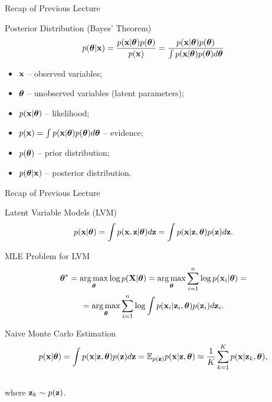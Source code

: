 \documentclass{beamer}
\begin{document}
\begin{frame}
	\titlepage
	\resetonslide
\end{frame}
\begin{frame}{Recap of Previous Lecture}
	\begin{block}{Posterior Distribution (Bayes' Theorem)}
		\[
			p(\boldsymbol{\theta} | \mathbf{x}) = \frac{p(\mathbf{x} | \boldsymbol{\theta}) p(\boldsymbol{\theta})}{p(\mathbf{x})} = \frac{p(\mathbf{x} | \boldsymbol{\theta}) p(\boldsymbol{\theta})}{\int p(\mathbf{x} | \boldsymbol{\theta}) p(\boldsymbol{\theta}) d \boldsymbol{\theta}} 
		\]
		\begin{itemize}
			\item $\mathbf{x}$ -- observed variables;
			\item $\boldsymbol{\theta}$ -- unobserved variables (latent parameters);
			\item $p(\mathbf{x} | \boldsymbol{\theta})$ -- likelihood;
			\item $p(\mathbf{x}) = \int p(\mathbf{x} | \boldsymbol{\theta}) p(\boldsymbol{\theta}) d \boldsymbol{\theta}$ -- evidence;
			\item $p(\boldsymbol{\theta})$ -- prior distribution;
			\item $p(\boldsymbol{\theta} | \mathbf{x})$ -- posterior distribution.
		\end{itemize}
	\end{block}
\end{frame}
\begin{frame}{Recap of Previous Lecture}
	\begin{block}{Latent Variable Models (LVM)}
		\vspace{-0.3cm}
		\[
			p(\mathbf{x} | \boldsymbol{\theta}) = \int p(\mathbf{x}, \mathbf{z} | \boldsymbol{\theta}) d\mathbf{z} = \int p(\mathbf{x} | \mathbf{z}, \boldsymbol{\theta}) p(\mathbf{z}) d\mathbf{z}.
		\]
	\end{block}
	\begin{block}{MLE Problem for LVM}
		\vspace{-0.7cm}
		\begin{multline*}
			\boldsymbol{\theta}^* = \operatorname*{arg\,max}_{\boldsymbol{\theta}} \log p(\mathbf{X}| \boldsymbol{\theta}) = \operatorname*{arg\,max}_{\boldsymbol{\theta}} \sum_{i=1}^n \log p(\mathbf{x}_i | \boldsymbol{\theta}) = \\ = \operatorname*{arg\,max}_{\boldsymbol{\theta}}  \sum_{i=1}^n \log \int p(\mathbf{x}_i| \mathbf{z}_i, \boldsymbol{\theta}) p(\mathbf{z}_i) d\mathbf{z}_i.
		\end{multline*}
		\vspace{-0.7cm}
	\end{block}
	\begin{block}{Naive Monte Carlo Estimation}
		\vspace{-0.7cm}
		\[
			p(\mathbf{x} | \boldsymbol{\theta}) = \int p(\mathbf{x} | \mathbf{z}, \boldsymbol{\theta}) p(\mathbf{z}) d\mathbf{z} = \mathbb{E}_{p(\mathbf{z})} p(\mathbf{x} | \mathbf{z}, \boldsymbol{\theta}) \approx \frac{1}{K} \sum_{k=1}^{K} p(\mathbf{x} | \mathbf{z}_k, \boldsymbol{\theta}),
		\]
		\vspace{-0.5cm} \\
		where $\mathbf{z}_k \sim p(\mathbf{z})$. 
	\end{block}
\end{frame}
\end{document}

